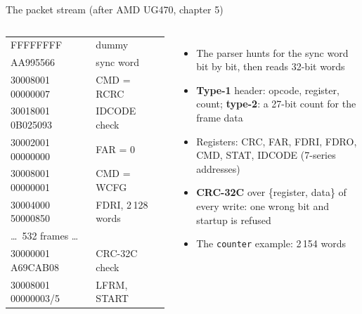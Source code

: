 \documentclass[aspectratio=169,11pt]{beamer}
\begin{document}
\begin{frame}{The packet stream (after AMD UG470, chapter 5)}
  \small
  \begin{columns}[T]
    \ttfamily\scriptsize
    \begin{tabular}{@{}ll@{}}
      FFFFFFFF & dummy \\
      \textcolor{bobamber}{AA995566} & \textcolor{bobamber}{sync word} \\
      30008001 00000007 & CMD = RCRC \\
      30018001 0B025093 & IDCODE check \\
      30002001 00000000 & FAR = 0 \\
      30008001 00000001 & CMD = WCFG \\
      30004000 50000850 & FDRI, 2\,128 words \\
      \textrm{\dots\ 532 frames \dots} & \\
      30000001 A69CAB08 & CRC-32C check \\
      30008001 00000003/5 & LFRM, START \\
    \end{tabular}
    \begin{itemize}
      \item The parser \alert{hunts} for the sync word bit by bit, then reads 32-bit words
      \item \textbf{Type-1} header: opcode, register, count; \textbf{type-2}: a 27-bit count for the frame data
      \item Registers: CRC, FAR, FDRI, FDRO, CMD, STAT, IDCODE (7-series addresses)
      \item \textbf{CRC-32C} over \{register, data\} of every write: one wrong bit and startup is refused
      \item The \texttt{counter} example: 2\,154 words
    \end{itemize}
  \end{columns}
\end{frame}
\end{document}
